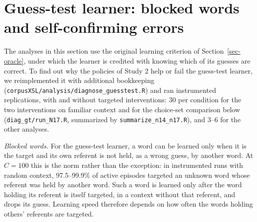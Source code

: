 \documentclass[11pt]{article}
\begin{document}
\section{Guess-test learner: blocked words and self-confirming errors}
\label{sec-gt-mech}
The analyses in this section use the original learning criterion of Section~\ref{sec-oracle}, under which the learner is credited with knowing which of its guesses are correct. To find out why the policies of Study 2 help or fail the guess-test learner, we reimplemented it with additional bookkeeping (\texttt{corpusXSL/analysis/diagnose\_guesstest.R}) and ran instrumented replications, with and without targeted interventions: 30 per condition for the two interventions on familiar context and for the choice-set comparison below (\texttt{diag\_gt/run\_N17.R}, summarized by \texttt{summarize\_n14\_n17.R}), and 3--6 for the other analyses.

\textit{Blocked words.} For the guess-test learner, a word can be learned only when it is the target and its own referent is not held, as a wrong guess, by another word. At $C=100$ this is the norm rather than the exception: in instrumented runs with random context, 97.5--99.9\% of active episodes targeted an unknown word whose referent was held by another word. Such a word is learned only after the word holding its referent is itself targeted, in a context without that referent, and drops its guess. Learning speed therefore depends on how often the words holding others' referents are targeted.
\end{document}
